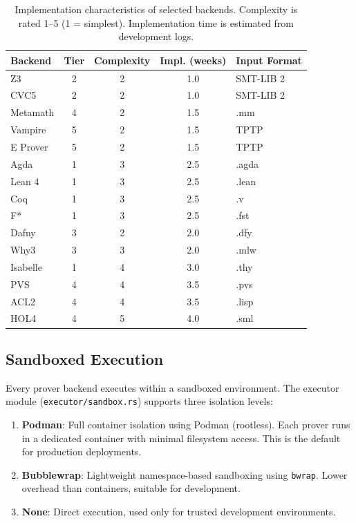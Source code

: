 \documentclass[11pt,a4paper]{article}
\begin{document}
\begin{table}[htbp]
\centering
\caption{Implementation characteristics of selected backends. Complexity is
rated 1--5 (1 = simplest). Implementation time is estimated from development
logs.}
\label{tab:complexity}
\small
\begin{tabular}{@{}lcccl@{}}
\toprule
\textbf{Backend} & \textbf{Tier} & \textbf{Complexity} & \textbf{Impl. (weeks)} & \textbf{Input Format} \\
\midrule
Z3      & 2 & 2 & 1.0 & SMT-LIB 2 \\
CVC5    & 2 & 2 & 1.0 & SMT-LIB 2 \\
Metamath & 4 & 2 & 1.5 & .mm \\
Vampire & 5 & 2 & 1.5 & TPTP \\
E Prover & 5 & 2 & 1.5 & TPTP \\
Agda    & 1 & 3 & 2.5 & .agda \\
Lean 4  & 1 & 3 & 2.5 & .lean \\
Coq     & 1 & 3 & 2.5 & .v \\
F*      & 1 & 3 & 2.5 & .fst \\
Dafny   & 3 & 2 & 2.0 & .dfy \\
Why3    & 3 & 3 & 2.0 & .mlw \\
Isabelle & 1 & 4 & 3.0 & .thy \\
PVS     & 4 & 4 & 3.5 & .pvs \\
ACL2    & 4 & 4 & 3.5 & .lisp \\
HOL4    & 4 & 5 & 4.0 & .sml \\
\bottomrule
\end{tabular}
\end{table}

\subsection{Sandboxed Execution}

Every prover backend executes within a sandboxed environment. The executor
module (\texttt{executor/sandbox.rs}) supports three isolation levels:

\begin{enumerate}
  \item \textbf{Podman}: Full container isolation using Podman (rootless). Each
  prover runs in a dedicated container with minimal filesystem access. This is
  the default for production deployments.

  \item \textbf{Bubblewrap}: Lightweight namespace-based sandboxing using
  \texttt{bwrap}. Lower overhead than containers, suitable for development.

  \item \textbf{None}: Direct execution, used only for trusted development
  environments.
\end{enumerate}
\end{document}
